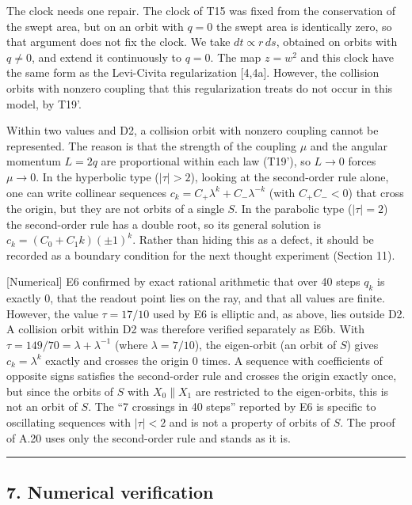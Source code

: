 \documentclass[
  a4paper,
]{article}
\begin{document}
The clock needs one repair. The clock of T15 was fixed from the
conservation of the swept area, but on an orbit with \(q=0\) the swept
area is identically zero, so that argument does not fix the clock. We
take \(dt\propto r\,ds\), obtained on orbits with \(q\neq0\), and extend
it continuously to \(q=0\). The map \(z=w^2\) and this clock have the
same form as the Levi-Civita regularization {[}4,4a{]}. However, the
collision orbits with nonzero coupling that this regularization treats
do not occur in this model, by T19'.

Within two values and D2, a collision orbit with nonzero coupling cannot
be represented. The reason is that the strength of the coupling \(\mu\)
and the angular momentum \(L=2q\) are proportional within each law
(T19'), so \(L\to0\) forces \(\mu\to0\). In the hyperbolic type
(\(\lvert\tau\rvert>2\)), looking at the second-order rule alone, one
can write collinear sequences \(c_k=C_+\lambda^k+C_-\lambda^{-k}\) (with
\(C_+C_-<0\)) that cross the origin, but they are not orbits of a single
\(S\). In the parabolic type (\(\lvert\tau\rvert=2\)) the second-order
rule has a double root, so its general solution is
\(c_k=(C_0+C_1k)(\pm1)^k\). Rather than hiding this as a defect, it
should be recorded as a boundary condition for the next thought
experiment (Section 11).

{[}Numerical{]} E6 confirmed by exact rational arithmetic that over 40
steps \(q_k\) is exactly 0, that the readout point lies on the ray, and
that all values are finite. However, the value \(\tau=17/10\) used by E6
is elliptic and, as above, lies outside D2. A collision orbit within D2
was therefore verified separately as E6b. With
\(\tau=149/70=\lambda+\lambda^{-1}\) (where \(\lambda=7/10\)), the
eigen-orbit (an orbit of \(S\)) gives \(c_k=\lambda^k\) exactly and
crosses the origin 0 times. A sequence with coefficients of opposite
signs satisfies the second-order rule and crosses the origin exactly
once, but since the orbits of \(S\) with \(X_0\parallel X_1\) are
restricted to the eigen-orbits, this is not an orbit of \(S\). The ``7
crossings in 40 steps'' reported by E6 is specific to oscillating
sequences with \(\lvert\tau\rvert<2\) and is not a property of orbits of
\(S\). The proof of A.20 uses only the second-order rule and stands as
it is.

\begin{center}\rule{0.5\linewidth}{0.5pt}\end{center}

\subsection{7. Numerical verification}\label{numerical-verification}
\end{document}
